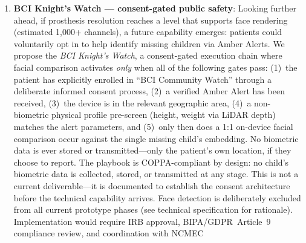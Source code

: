 \begin{enumerate}
        depth data serves as a defense-in-depth failsafe: if the AI classification
        layer fails, the patient still receives spatial information from the depth
        sensor. This work bridges TARA from a theoretical threat catalog to a testable
        security framework applied to a clinical vision restoration scenario. Phase~3
        requires clinical collaboration with vision prosthesis researchers and guide
        dog training organizations. Full technical specification:
        \url{https://github.com/qinnovates/qinnovate/blob/main/docs/research/lidar-bci-bridge-technical-spec.md}
  \item \textbf{BCI Knight's Watch --- consent-gated public safety}: Looking further
        ahead, if prosthesis resolution reaches a level that supports face rendering
        (estimated 1,000+ channels), a future capability emerges: patients could
        voluntarily opt in to help identify missing children via Amber Alerts. We
        propose the \emph{BCI Knight's Watch}, a consent-gated execution chain where
        facial comparison activates \emph{only} when all of the following gates pass:
        (1)~the patient has explicitly enrolled in ``BCI Community Watch'' through a
        deliberate informed consent process, (2)~a verified Amber Alert has been
        received, (3)~the device is in the relevant geographic area, (4)~a
        non-biometric physical profile pre-screen (height, weight via LiDAR depth)
        matches the alert parameters, and (5)~only then does a 1:1 on-device facial
        comparison occur against the single missing child's embedding. No biometric
        data is ever stored or transmitted---only the patient's own location, if they
        choose to report. The playbook is COPPA-compliant by design: no child's
        biometric data is collected, stored, or transmitted at any stage. This is not a
        current deliverable---it is documented to establish the consent architecture
        before the technical capability arrives. Face detection is deliberately
        excluded from all current prototype phases (see technical specification for
        rationale). Implementation would require IRB approval, BIPA/GDPR~Article~9
        compliance review, and coordination with NCMEC
\end{enumerate}
